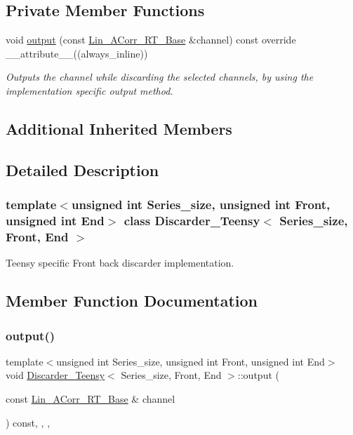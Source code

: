 \subsection*{Private Member Functions}
\begin{DoxyCompactItemize}
\item 
void \hyperlink{classDiscarder__Teensy_a968465e540ae1372c26c9c6d0e5c928b}{output} (const \hyperlink{classLin__ACorr__RT__Base}{Lin\+\_\+\+A\+Corr\+\_\+\+R\+T\+\_\+\+Base} \&channel) const override \+\_\+\+\_\+attribute\+\_\+\+\_\+((always\+\_\+inline))
\begin{DoxyCompactList}\small\item\em Outputs the channel while discarding the selected channels, by using the implementation specific output method. \end{DoxyCompactList}\end{DoxyCompactItemize}
\subsection*{Additional Inherited Members}


\subsection{Detailed Description}
\subsubsection*{template$<$unsigned int Series\+\_\+size, unsigned int Front, unsigned int End$>$\newline
class Discarder\+\_\+\+Teensy$<$ Series\+\_\+size, Front, End $>$}

Teensy specific Front back discarder implementation. 

\subsection{Member Function Documentation}
\mbox{\label{classDiscarder__Teensy_a968465e540ae1372c26c9c6d0e5c928b}} 
\subsubsection{\texorpdfstring{output()}{output()}}
{\footnotesize\ttfamily template$<$unsigned int Series\+\_\+size, unsigned int Front, unsigned int End$>$ \\
void \hyperlink{classDiscarder__Teensy}{Discarder\+\_\+\+Teensy}$<$ Series\+\_\+size, Front, End $>$\+::output (\begin{DoxyParamCaption}\item[{const \hyperlink{classLin__ACorr__RT__Base}{Lin\+\_\+\+A\+Corr\+\_\+\+R\+T\+\_\+\+Base} \&}]{channel }\end{DoxyParamCaption}) const\hspace{0.3cm}{\ttfamily [inline]}, {\ttfamily [override]}, {\ttfamily [private]}, {\ttfamily [virtual]}}



